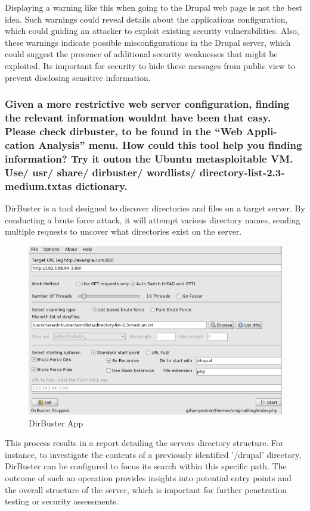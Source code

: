 Displaying a warning like this when going to the Drupal web page is not the best idea.
Such warnings could reveal details about the applications configuration, which could guiding an attacker to exploit existing security vulnerabilities.
Also, these warnings indicate possible misconfigurations in the Drupal server, which could suggest the presence of additional security weaknesses that might be exploited.
Its important for security to hide these messages from public view to prevent disclosing sensitive information.

\subsubsection{Given a more restrictive web server configuration, finding the relevant information wouldnt have been that easy. Please check dirbuster, to be found in the “Web Appli-cation Analysis” menu. How could this tool help you finding information? Try it outon the Ubuntu metasploitable VM. Use/ usr/ share/ dirbuster/ wordlists/ directory-list-2.3-medium.txtas dictionary.}

DirBuster is a tool designed to discover directories and files on a target server. By conducting a brute force attack, it will attempt various directory names,
sending multiple requests to uncover what directories exist on the server.

\begin{figure}[H]
    \centering
    \includegraphics[width=0.9\linewidth]{pic/DirBuster App.png}
    \caption{DirBuster App}
    \label{fig:DirBuster App}
\end{figure}

This process results in a report detailing the servers directory structure.
For instance, to investigate the contents of a previously identified '/drupal' directory, DirBuster can be configured to focus its search within this specific path.
The outcome of such an operation provides insights into potential entry points and the overall structure of the server,
which is important for further penetration testing or security assessments.

